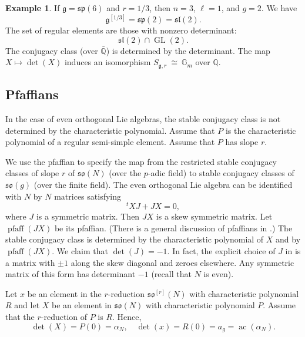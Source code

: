 \documentclass[11pt]{amsart}
\theoremstyle{definition}
\newtheorem{example}[theorem]{Example}
\theoremstyle{remark}
\numberwithin{equation}{theorem}
\def\iso{{\ \cong\ }}
\newcommand{\ring}[1]{\mathbb{#1}}
\def\op#1{\operatorname{#1}}
\def\lie#1{{\mathfrak{#1}}}
\begin{document}
\begin{example}  If $\lie{g}=\lie{sp}(6)$ and $r=1/3$, then
$n=3$, $\ell=1$, and $g=2$.  We have
   \begin{equation}
   \lie{g}^{[1/3]} = \lie{sp}(2) = \lie{sl}(2).
   \end{equation}
The set of regular elements are those with nonzero determinant:
   \begin{equation}
   \lie{sl}(2)\cap \op{GL}(2).
   \end{equation}
The conjugacy class (over $\bar{\ring{Q}}$) is determined by the
determinant.  The map
   $X\mapsto \det(X)$
induces an isomorphism $S_{\lie{g},r}\iso \ring{G}_m$ over
$\ring{Q}$.
\end{example}

\subsection{Pfaffians}\label{sec:pfaff}

In the case of even orthogonal Lie algebras, the stable conjugacy
class is not determined by the characteristic polynomial. Assume
that $P$ is the characteristic polynomial of a regular semi-simple
element.  Assume that $P$ has slope $r$.


We use the pfaffian to specify the map from the restricted  stable
conjugacy classes of slope $r$ of $\lie{so}(N)$ (over the $p$-adic
field) to stable conjugacy classes of $\lie{so}(g)$ (over the finite
field). The even orthogonal Lie algebra can be identified with $N$
by $N$ matrices satisfying
    \begin{equation}{}^t X J + J X= 0,\end{equation}
where $J$ is a symmetric matrix.  Then $JX$ is a skew symmetric
matrix.  Let $\op{pfaff}(JX)$ be its pfaffian.  (There is a
general discussion of pfaffians in \cite{G}.) The stable conjugacy
class is determined by the characteristic polynomial of $X$ and by
$\op{pfaff}(JX)$. We claim that
    $\det(J)= -1$.
In fact, the explicit choice of $J$  in \cite{WA} is a matrix with
$\pm1$ along the skew diagonal and zeroes elsewhere. Any symmetric
matrix of this form has determinant $-1$ (recall that $N$ is
even).

Let $x$ be an element in the $r$-reduction $\lie{so}^{[r]}(N)$
with characteristic polynomial $R$ and let $X$ be an element in
$\lie{so}(N)$ with characteristic polynomial $P$. Assume that the
$r$-reduction of $P$ is $R$.   Hence,
   \begin{equation}\det(X) = P(0) = \alpha_N,\quad \det(x) = R(0)=a_g =
   \op{ac}(\alpha_N).\label{eqn:det}\end{equation}
\end{document}
